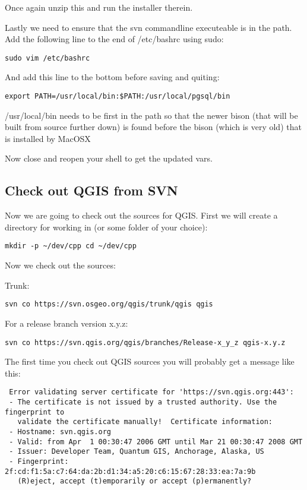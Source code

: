 Once again unzip this and run the installer therein.

Lastly we need to ensure that the svn commandline executeable is in the path.
Add the following line to the end of /etc/bashrc using sudo:

\begin{verbatim}
sudo vim /etc/bashrc 
\end{verbatim}

And add this line to the bottom before saving and quiting:

\begin{verbatim}
export PATH=/usr/local/bin:$PATH:/usr/local/pgsql/bin 
\end{verbatim}

/usr/local/bin needs to be first in the path so that the newer bison (that will
be built from source further down) is found before the bison (which is very
old) that is installed by MacOSX

Now close and reopen your shell to get the updated vars.

\subsection{Check out QGIS from SVN}
Now we are going to check out the sources for QGIS. First we will create a
directory for working in (or some folder of your choice):

\begin{verbatim}
mkdir -p ~/dev/cpp cd ~/dev/cpp 
\end{verbatim}

Now we check out the sources:

Trunk:

\begin{verbatim}
svn co https://svn.osgeo.org/qgis/trunk/qgis qgis 
\end{verbatim}

For a release branch version x.y.z:

\begin{verbatim}
svn co https://svn.qgis.org/qgis/branches/Release-x_y_z qgis-x.y.z
\end{verbatim}

The first time you check out QGIS sources you will probably get a message like
this:

\begin{verbatim}
 Error validating server certificate for 'https://svn.qgis.org:443':
 - The certificate is not issued by a trusted authority. Use the fingerprint to
   validate the certificate manually!  Certificate information:
 - Hostname: svn.qgis.org
 - Valid: from Apr  1 00:30:47 2006 GMT until Mar 21 00:30:47 2008 GMT
 - Issuer: Developer Team, Quantum GIS, Anchorage, Alaska, US
 - Fingerprint: 2f:cd:f1:5a:c7:64:da:2b:d1:34:a5:20:c6:15:67:28:33:ea:7a:9b
   (R)eject, accept (t)emporarily or accept (p)ermanently?  
\end{verbatim}


